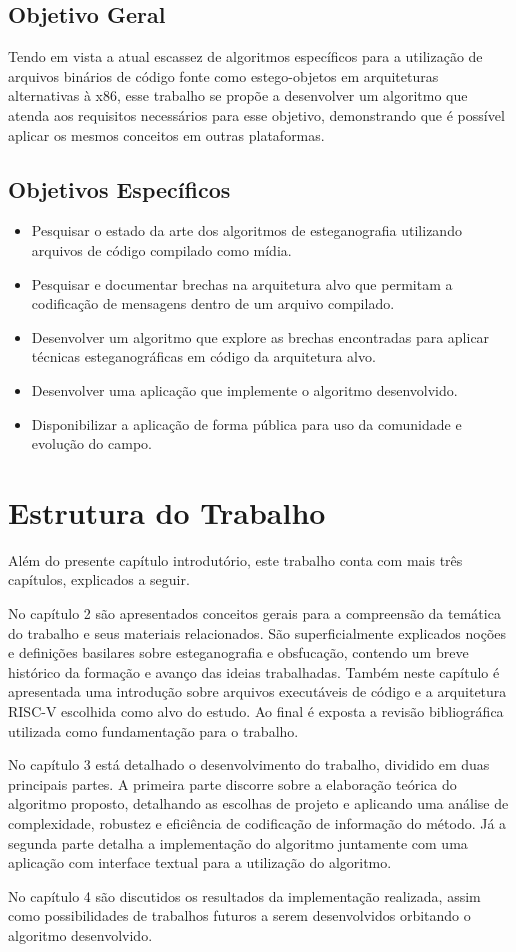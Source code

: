 \subsection{Objetivo Geral}

Tendo em vista a atual escassez de algoritmos específicos para a utilização de arquivos binários de código fonte como estego-objetos em arquiteturas alternativas à x86, esse trabalho se propõe a desenvolver um algoritmo que atenda aos requisitos necessários para esse objetivo, demonstrando que é possível aplicar os mesmos conceitos em outras plataformas.

\subsection{Objetivos Específicos}

\begin{itemize}
    \item Pesquisar o estado da arte dos algoritmos de esteganografia utilizando arquivos de código compilado como mídia.
    \item Pesquisar e documentar brechas na arquitetura alvo que permitam a codificação de mensagens dentro de um arquivo compilado.
    \item Desenvolver um algoritmo que explore as brechas encontradas para aplicar técnicas esteganográficas em código da arquitetura alvo.
    \item Desenvolver uma aplicação que implemente o algoritmo desenvolvido.
    \item Disponibilizar a aplicação de forma pública para uso da comunidade e evolução do campo.
\end{itemize}

\section{Estrutura do Trabalho}

Além do presente capítulo introdutório, este trabalho conta com mais três capítulos, explicados a seguir.

No capítulo 2 são apresentados conceitos gerais para a compreensão da temática do trabalho e seus materiais relacionados. São superficialmente explicados noções e definições basilares sobre esteganografia e obsfucação, contendo um breve histórico da formação e avanço das ideias trabalhadas. Também neste capítulo é apresentada uma introdução sobre arquivos executáveis de código e a arquitetura RISC-V escolhida como alvo do estudo. Ao final é exposta a revisão bibliográfica utilizada como fundamentação para o trabalho.

No capítulo 3 está detalhado o desenvolvimento do trabalho, dividido em duas principais partes. A primeira parte discorre sobre a elaboração teórica do algoritmo proposto, detalhando as escolhas de projeto e aplicando uma análise de complexidade, robustez e eficiência de codificação de informação do método. Já a segunda parte detalha a implementação do algoritmo juntamente com uma aplicação com interface textual para a utilização do algoritmo.

No capítulo 4 são discutidos os resultados da implementação realizada, assim como possibilidades de trabalhos futuros a serem desenvolvidos orbitando o algoritmo desenvolvido.